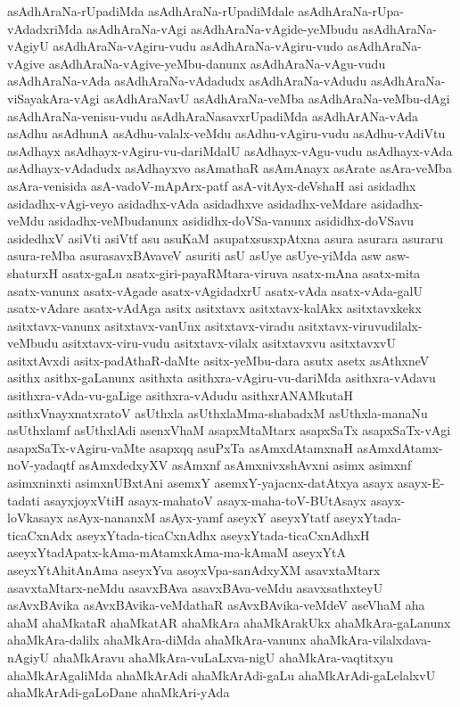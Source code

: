 {asAdhAraNa-rUpadiMda
asAdhAraNa-rUpadiMdale
asAdhAraNa-rUpa-vAdadxriMda
asAdhAraNa-vAgi
asAdhAraNa-vAgide-yeMbudu
asAdhAraNa-vAgiyU
asAdhAraNa-vAgiru-vudu
asAdhAraNa-vAgiru-vudo
asAdhAraNa-vAgive
asAdhAraNa-vAgive-yeMbu-danunx
asAdhAraNa-vAgu-vudu
asAdhAraNa-vAda
asAdhAraNa-vAdadudx
asAdhAraNa-vAdudu
asAdhAraNa-viSayakAra-vAgi
asAdhAraNavU
asAdhAraNa-veMba
asAdhAraNa-veMbu-dAgi
asAdhAraNa-venisu-vudu
asAdhAraNasavxrUpadiMda
asAdhArANa-vAda
asAdhu
asAdhunA
asAdhu-valalx-veMdu
asAdhu-vAgiru-vudu
asAdhu-vAdiVtu
asAdhayx
asAdhayx-vAgiru-vu-dariMdalU
asAdhayx-vAgu-vudu
asAdhayx-vAda
asAdhayx-vAdadudx
asAdhayxvo
asAmathaR
asAmAnayx
asArate
asAra-veMba
asAra-venisida
asA-vadoV-mApArx-patf
asA-vitAyx-deVshaH
asi
asidadhx
asidadhx-vAgi-veyo
asidadhx-vAda
asidadhxve
asidadhx-veMdare
asidadhx-veMdu
asidadhx-veMbudanunx
asididhx-doVSa-vanunx
asididhx-doVSavu
asidedhxV
asiVti
asiVtf
asu
asuKaM
asupatxsusxpAtxna
asura
asurara
asuraru
asura-reMba
asurasavxBAvaveV
asuriti
asU
asUye
asUye-yiMda
asw
asw-shaturxH
asatx-gaLu
asatx-giri-payaRMtara-viruva
asatx-mAna
asatx-mita
asatx-vanunx
asatx-vAgade
asatx-vAgidadxrU
asatx-vAda
asatx-vAda-galU
asatx-vAdare
asatx-vAdAga
asitx
asitxtavx
asitxtavx-kalAkx
asitxtavxkekx
asitxtavx-vanunx
asitxtavx-vanUnx
asitxtavx-viradu
asitxtavx-viruvudilalx-veMbudu
asitxtavx-viru-vudu
asitxtavx-vilalx
asitxtavxvu
asitxtavxvU
asitxtAvxdi
asitx-padAthaR-daMte
asitx-yeMbu-dara
asutx
asetx
asAthxneV
asithx
asithx-gaLanunx
asithxta
asithxra-vAgiru-vu-dariMda
asithxra-vAdavu
asithxra-vAda-vu-gaLige
asithxra-vAdudu
asithxrANAMkutaH
asithxVnayxnatxratoV
asUthxla
asUthxlaMma-shabadxM
asUthxla-manaNu
asUthxlamf
asUthxlAdi
asenxVhaM
asapxMtaMtarx
asapxSaTx
asapxSaTx-vAgi
asapxSaTx-vAgiru-vaMte
asapxqq
asuPxTa
asAmxdAtamxnaH
asAmxdAtamx-noV-yadaqtf
asAmxdedxyXV
asAmxnf
asAmxnivxshAvxni
asimx
asimxnf
asimxninxti
asimxnUBxtAni
asemxY
asemxY-yajacnx-datAtxya
asayx
asayx-E-tadati
asayxjoyxVtiH
asayx-mahatoV
asayx-maha-toV-BUtAsayx
asayx-loVkasayx
asAyx-nananxM
asAyx-yamf
aseyxY
aseyxYtatf
aseyxYtada-ticaCxnAdx
aseyxYtada-ticaCxnAdhx
aseyxYtada-ticaCxnAdhxH
aseyxYtadApatx-kAma-mAtamxkAma-ma-kAmaM
aseyxYtA
aseyxYtAhitAnAma
aseyxYva
asoyxVpa-sanAdxyXM
asavxtaMtarx
asavxtaMtarx-neMdu
asavxBAva
asavxBAva-veMdu
asavxsathxteyU
asAvxBAvika
asAvxBAvika-veMdathaR
asAvxBAvika-veMdeV
aseVhaM
aha
ahaM
ahaMkataR
ahaMkatAR
ahaMkAra
ahaMkArakUkx
ahaMkAra-gaLanunx
ahaMkAra-dalilx
ahaMkAra-diMda
ahaMkAra-vanunx
ahaMkAra-vilalxdava-nAgiyU
ahaMkAravu
ahaMkAra-vuLaLxva-nigU
ahaMkAra-vaqtitxyu
ahaMkArAgaliMda
ahaMkArAdi
ahaMkArAdi-gaLu
ahaMkArAdi-gaLelalxvU
ahaMkArAdi-gaLoDane
ahaMkAri-yAda
}
